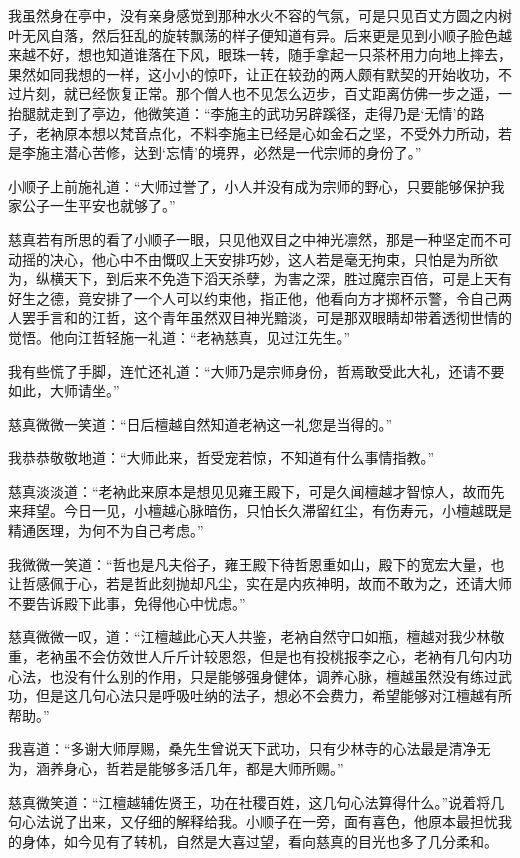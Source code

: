我虽然身在亭中，没有亲身感觉到那种水火不容的气氛，可是只见百丈方圆之内树叶无风自落，然后狂乱的旋转飘荡的样子便知道有异。后来更是见到小顺子脸色越来越不好，想也知道谁落在下风，眼珠一转，随手拿起一只茶杯用力向地上摔去，果然如同我想的一样，这小小的惊吓，让正在较劲的两人颇有默契的开始收功，不过片刻，就已经恢复正常。那个僧人也不见怎么迈步，百丈距离仿佛一步之遥，一抬腿就走到了亭边，他微笑道：“李施主的武功另辟蹊径，走得乃是‘无情’的路子，老衲原本想以梵音点化，不料李施主已经是心如金石之坚，不受外力所动，若是李施主潜心苦修，达到‘忘情’的境界，必然是一代宗师的身份了。”

小顺子上前施礼道：“大师过誉了，小人并没有成为宗师的野心，只要能够保护我家公子一生平安也就够了。”

慈真若有所思的看了小顺子一眼，只见他双目之中神光凛然，那是一种坚定而不可动摇的决心，他心中不由慨叹上天安排巧妙，这人若是毫无拘束，只怕是为所欲为，纵横天下，到后来不免造下滔天杀孽，为害之深，胜过魔宗百倍，可是上天有好生之德，竟安排了一个人可以约束他，指正他，他看向方才掷杯示警，令自己两人罢手言和的江哲，这个青年虽然双目神光黯淡，可是那双眼睛却带着透彻世情的觉悟。他向江哲轻施一礼道：“老衲慈真，见过江先生。”

我有些慌了手脚，连忙还礼道：“大师乃是宗师身份，哲焉敢受此大礼，还请不要如此，大师请坐。”

慈真微微一笑道：“日后檀越自然知道老衲这一礼您是当得的。”

我恭恭敬敬地道：“大师此来，哲受宠若惊，不知道有什么事情指教。”

慈真淡淡道：“老衲此来原本是想见见雍王殿下，可是久闻檀越才智惊人，故而先来拜望。今日一见，小檀越心脉暗伤，只怕长久滞留红尘，有伤寿元，小檀越既是精通医理，为何不为自己考虑。”

我微微一笑道：“哲也是凡夫俗子，雍王殿下待哲恩重如山，殿下的宽宏大量，也让哲感佩于心，若是哲此刻抛却凡尘，实在是内疚神明，故而不敢为之，还请大师不要告诉殿下此事，免得他心中忧虑。”

慈真微微一叹，道：“江檀越此心天人共鉴，老衲自然守口如瓶，檀越对我少林敬重，老衲虽不会仿效世人斤斤计较恩怨，但是也有投桃报李之心，老衲有几句内功心法，也没有什么别的作用，只是能够强身健体，调养心脉，檀越虽然没有练过武功，但是这几句心法只是呼吸吐纳的法子，想必不会费力，希望能够对江檀越有所帮助。”

我喜道：“多谢大师厚赐，桑先生曾说天下武功，只有少林寺的心法最是清净无为，涵养身心，哲若是能够多活几年，都是大师所赐。”

慈真微笑道：“江檀越辅佐贤王，功在社稷百姓，这几句心法算得什么。”说着将几句心法说了出来，又仔细的解释给我。小顺子在一旁，面有喜色，他原本最担忧我的身体，如今见有了转机，自然是大喜过望，看向慈真的目光也多了几分柔和。

